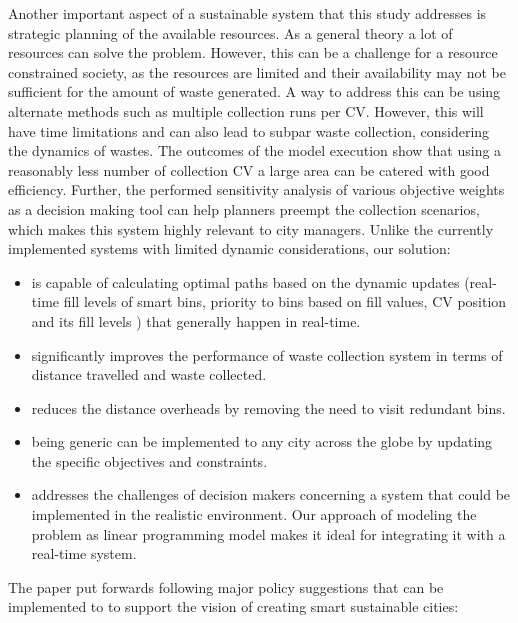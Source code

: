 \documentclass[12pt]{article}
\begin{document}
Another important aspect of a sustainable system that this study addresses is strategic planning of the available resources. As a general theory a lot of resources can solve the problem. However, this can be a challenge for a resource constrained society, as the resources are limited and their availability may not be sufficient for the amount of waste generated. A way to address this can be using alternate methods such as multiple collection runs per CV. However, this will have time limitations and can also lead to subpar waste collection, considering the dynamics of wastes. The outcomes of the model execution show that using a reasonably less number of collection CV a large area can be catered with good efficiency. Further, the performed sensitivity analysis of various objective weights as a decision making tool can help planners preempt the collection scenarios, which makes this system highly relevant to city managers.
Unlike the currently implemented systems with limited dynamic considerations, our solution:
\begin{itemize}
   
    \item is capable of calculating optimal paths based on the dynamic updates (real-time fill levels of smart bins, priority to bins based on fill values, CV position and its fill levels ) that generally happen in real-time.
    \item significantly improves the performance of waste collection system in terms of distance travelled and waste collected.
    \item reduces the distance overheads by removing the need to visit redundant bins.
    \item being generic can be implemented to any city across the globe by updating the specific objectives and constraints. 
    
    \item addresses the challenges of decision makers concerning a system that could be implemented in the realistic environment. Our approach of modeling the problem as linear programming model makes it ideal for integrating it with a real-time system. 

\end{itemize}

The paper put forwards following major policy suggestions that can be implemented to to support the vision of creating smart sustainable cities:
\end{document}
